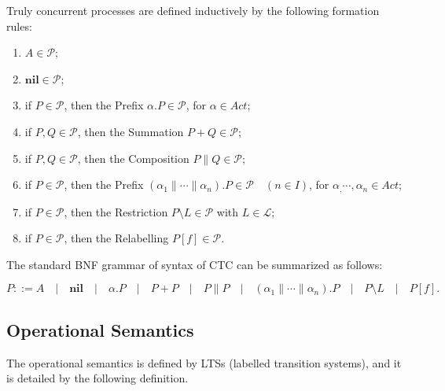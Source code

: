 \begin{definition}[Syntax]\label{syntax}
Truly concurrent processes are defined inductively by the following formation rules:

\begin{enumerate}
  \item $A\in\mathcal{P}$;
  \item $\textbf{nil}\in\mathcal{P}$;
  \item if $P\in\mathcal{P}$, then the Prefix $\alpha.P\in\mathcal{P}$, for $\alpha\in Act$;
  \item if $P,Q\in\mathcal{P}$, then the Summation $P+Q\in\mathcal{P}$;
  \item if $P,Q\in\mathcal{P}$, then the Composition $P\parallel Q\in\mathcal{P}$;
  \item if $P\in\mathcal{P}$, then the Prefix $(\alpha_1\parallel\cdots\parallel\alpha_n).P\in\mathcal{P}\quad(n\in I)$, for $\alpha_,\cdots,\alpha_n\in Act$;
  \item if $P\in\mathcal{P}$, then the Restriction $P\setminus L\in\mathcal{P}$ with $L\in\mathcal{L}$;
  \item if $P\in\mathcal{P}$, then the Relabelling $P[f]\in\mathcal{P}$.
\end{enumerate}

The standard BNF grammar of syntax of CTC can be summarized as follows:

$$P::=A\quad|\quad\textbf{nil}\quad|\quad\alpha.P\quad|\quad P+P\quad |\quad P\parallel P\quad |\quad (\alpha_1\parallel\cdots\parallel\alpha_n).P \quad|\quad P\setminus L\quad |\quad P[f].$$
\end{definition}

\subsection{Operational Semantics}

The operational semantics is defined by LTSs (labelled transition systems), and it is detailed by the following definition.

